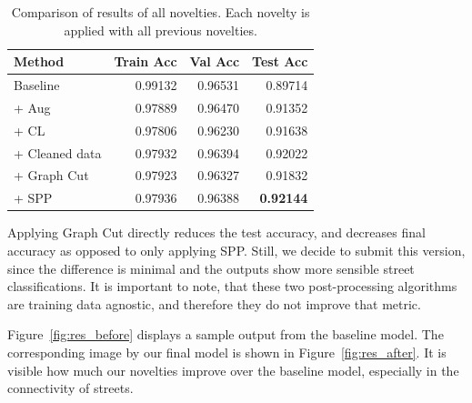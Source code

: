 \begin{table}[ht]
    \centering
    \caption{
        Comparison of results of all novelties.
        Each novelty is applied with all previous novelties.
    }%
    \label{results:metrics}
    \begin{tabular}{l r r r} 
        \toprule
        Method & Train Acc & Val Acc & Test Acc \\
        \midrule
        Baseline & 0.99132 & 0.96531 & 0.89714 \\ 
        + Aug & 0.97889 & 0.96470 & 0.91352 \\
        + CL & 0.97806 & 0.96230 & 0.91638 \\
        + Cleaned data & 0.97932 & 0.96394 & 0.92022 \\
        + Graph Cut & 0.97923 & 0.96327 & 0.91832 \\
        + SPP & 0.97936 & 0.96388 & \textbf{0.92144} \\
        \bottomrule
    \end{tabular}
\end{table}

Applying Graph Cut directly reduces the test accuracy, and decreases final accuracy as opposed to only applying SPP.
Still, we decide to submit this version, since the difference is minimal and the outputs show more sensible street classifications.
It is important to note, that these two post-processing algorithms are training data agnostic, and therefore they do not improve that metric.

Figure~\ref{fig:res_before} displays a sample output from the baseline model.
The corresponding image by our final model is shown in Figure~\ref{fig:res_after}.
It is visible how much our novelties improve over the baseline model, especially in the connectivity of streets.